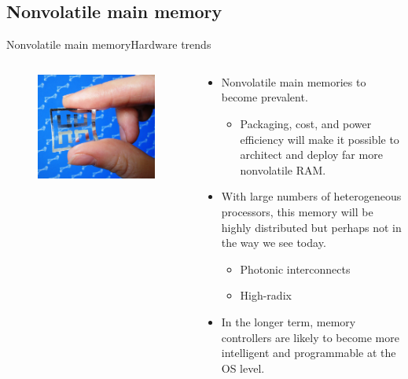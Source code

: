 \documentclass[10pt]{beamer}
\begin{document}
\subsection{Nonvolatile main memory}
\begin{frame}{Nonvolatile main memory}{Hardware trends}
  \begin{columns}[T] %
    \begin{column}{.2\textwidth}
      \begin{figure}[ht]
        \includegraphics[width=1.8\textwidth, keepaspectratio=true]{images/nvm.jpg}
      \end{figure} \pause
    \end{column}%

    \hfill%
    \begin{column}{.7\textwidth}
      \begin{itemize}
        \item Nonvolatile main memories to become prevalent.
        \begin{itemize}
          \item Packaging, cost, and power efficiency will make it possible to
                architect and deploy far more nonvolatile RAM. \pause
        \end{itemize}
        \item With large numbers of heterogeneous processors, this memory will be
              highly distributed but perhaps not in the way we see today. \pause
          \begin{itemize}
            \item Photonic interconnects
            \item High-radix
          \end{itemize} \pause
        \item In the longer term, memory controllers are likely to become more
              intelligent and programmable at the OS level.
      \end{itemize}
    \end{column}%
\end{columns}
\end{frame}
\end{document}
